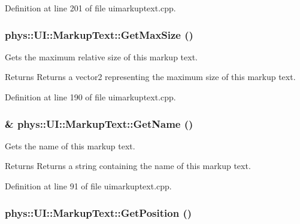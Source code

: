 Definition at line 201 of file uimarkuptext.cpp.

\hypertarget{classphys_1_1UI_1_1MarkupText_ae68fd261f2dc9494a16e3089c7a35b8a}{
\subsubsection[{GetMaxSize}]{ phys::UI::MarkupText::GetMaxSize ()}}
\label{d7/d23/classphys_1_1UI_1_1MarkupText_ae68fd261f2dc9494a16e3089c7a35b8a}


Gets the maximum relative size of this markup text. 

\begin{DoxyReturn}{Returns}
Returns a vector2 representing the maximum size of this markup text. 
\end{DoxyReturn}


Definition at line 190 of file uimarkuptext.cpp.

\hypertarget{classphys_1_1UI_1_1MarkupText_afa64067f890466ad4844c4836e7667fd}{
\subsubsection[{GetName}]{ \& phys::UI::MarkupText::GetName ()}}
\label{d7/d23/classphys_1_1UI_1_1MarkupText_afa64067f890466ad4844c4836e7667fd}


Gets the name of this markup text. 

\begin{DoxyReturn}{Returns}
Returns a string containing the name of this markup text. 
\end{DoxyReturn}


Definition at line 91 of file uimarkuptext.cpp.

\hypertarget{classphys_1_1UI_1_1MarkupText_a9d92f03e1cad181a5d8f20f3f95cf7cc}{
\subsubsection[{GetPosition}]{ phys::UI::MarkupText::GetPosition ()}}
\label{d7/d23/classphys_1_1UI_1_1MarkupText_a9d92f03e1cad181a5d8f20f3f95cf7cc}


